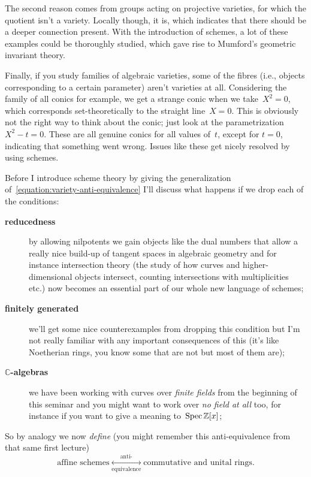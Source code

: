 The second reason comes from groups acting on projective varieties, for which the quotient isn't a variety. Locally though, it is, which indicates that there should be a deeper connection present. With the introduction of schemes, a lot of these examples could be thoroughly studied, which gave rise to Mumford's geometric invariant theory.

Finally, if you study families of algebraic varieties, some of the fibres (i.e., objects corresponding to a certain parameter) aren't varieties at all. Considering the family of all conics for example, we get a strange conic when we take~$X^{2}=0$, which corresponds set-theoretically to the straight line~$X=0$. This is obviously not the right way to think about the conic; just look at the parametrization~$X^{2}-t=0$. These are all genuine conics for all values of~$t$, except for $t=0$, indicating that something went wrong. Issues like these get nicely resolved by using schemes. 

Before I introduce scheme theory by giving the generalization of~\eqref{equation:variety-anti-equivalence} I'll discuss what happens if we drop each of the conditions:
\begin{description}
  \item[\textbf{reducedness}] by allowing nilpotents we gain objects like the dual numbers that allow a really nice build-up of tangent spaces in algebraic geometry and for instance intersection theory (the study of how curves and higher-dimensional objects intersect, counting intersections with multiplicities etc.) now becomes an essential part of our whole new language of schemes;
  \item[\textbf{finitely generated}] we'll get some nice counterexamples from dropping this condition but I'm not really familiar with any important consequences of this (it's like Noetherian rings, you know some that are not but most of them are);
  \item[\textbf{$\mathbb{C}$-algebras}] we have been working with curves over \emph{finite fields} from the beginning of this seminar and you might want to work over \emph{no field at all} too, for instance if you want to give a meaning to~$\operatorname{Spec}\mathbb{Z}[x]$;
\end{description}

So by analogy we now \emph{define} (you might remember this anti-equivalence from that same first lecture)
\begin{equation}
  \label{equation:scheme-anti-equivalence}
  \text{affine schemes} \underset{\text{equivalence}}{\overset{\text{anti-}}{\longleftrightarrow}} \text{commutative and unital rings}.
\end{equation}

